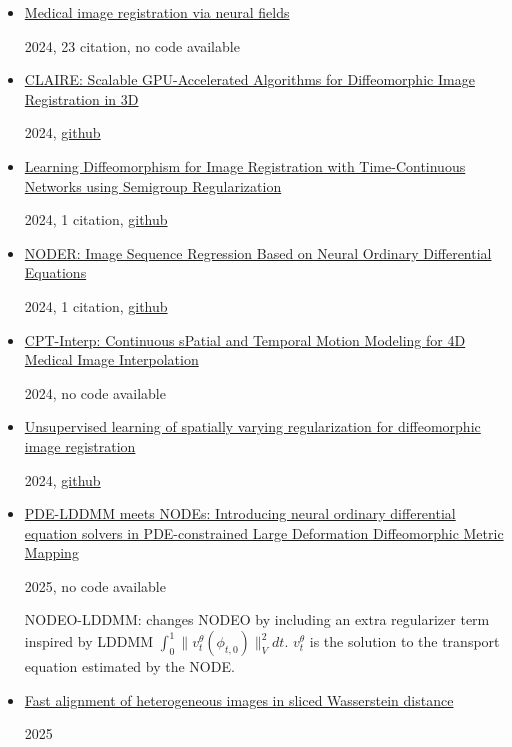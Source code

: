 \documentclass{article}
\begin{document}
\begin{itemize}
\item \href{https://www.sciencedirect.com/science/article/pii/S1361841524001749}{Medical image registration via neural fields}

2024, 23 citation, no code available

\item \href{https://arxiv.org/abs/2401.17493}{CLAIRE: Scalable GPU-Accelerated Algorithms for Diffeomorphic Image Registration in 3D} 

2024, \href{https://github.com/andreasmang/claire}{github}

\item \href{https://arxiv.org/abs/2405.18684}{Learning Diffeomorphism for Image Registration with Time-Continuous Networks using Semigroup Regularization}

2024, 1 citation, \href{https://github.com/mattkia/SGDIR}{github}

\item \href{https://arxiv.org/abs/2407.13241}{NODER: Image Sequence Regression Based on Neural Ordinary Differential Equations}

2024, 1 citation, \href{https://github.com/ZedKing12138/NODER-pytorch}{github}

\item \href{https://arxiv.org/abs/2405.15385}{CPT-Interp: Continuous sPatial and Temporal Motion Modeling for 4D Medical Image Interpolation}

2024, no code available

\item \href{https://arxiv.org/pdf/2412.17982}{Unsupervised learning of spatially varying regularization for diffeomorphic image
registration}

2024, \href{https://github.com/junyuchen245/Spatially-Varying-Regularization-ImgReg}{github}

\item \href{https://www.sciencedirect.com/science/article/pii/S1877750324003004}{PDE-LDDMM meets NODEs: Introducing neural ordinary differential equation solvers in PDE-constrained Large Deformation Diffeomorphic Metric Mapping}

2025, no code available

NODEO-LDDMM: changes NODEO by including an extra regularizer term inspired by LDDMM $\int_0^1 \| v_t^{\theta}(\phi _{t,0})\|_V^2dt$. $v_t^\theta$ is the solution to the transport equation estimated by the NODE.

\item \href{https://arxiv.org/abs/2503.13756}{Fast alignment of heterogeneous images in sliced Wasserstein distance}

2025

\end{itemize}
\end{document}
